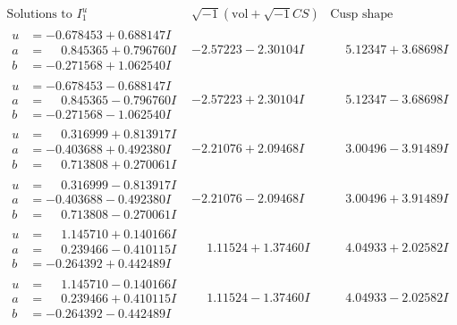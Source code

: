 \documentclass[1p]{elsarticle_modified}
\theoremstyle{definition}
\newcommand{\I}{\sqrt{-1}}
\begin{document}
$$\begin{array}{c|c|c}  
\text{Solutions to }I^u_{1}& \I (\text{vol} + \sqrt{-1}CS) & \text{Cusp shape}\\
 \hline 
\begin{aligned}
u &= -0.678453 + 0.688147 I \\
a &= \phantom{-}0.845365 + 0.796760 I \\
b &= -0.271568 + 1.062540 I\end{aligned}
 & -2.57223 - 2.30104 I & \phantom{-}5.12347 + 3.68698 I \\ \hline\begin{aligned}
u &= -0.678453 - 0.688147 I \\
a &= \phantom{-}0.845365 - 0.796760 I \\
b &= -0.271568 - 1.062540 I\end{aligned}
 & -2.57223 + 2.30104 I & \phantom{-}5.12347 - 3.68698 I \\ \hline\begin{aligned}
u &= \phantom{-}0.316999 + 0.813917 I \\
a &= -0.403688 + 0.492380 I \\
b &= \phantom{-}0.713808 + 0.270061 I\end{aligned}
 & -2.21076 + 2.09468 I & \phantom{-}3.00496 - 3.91489 I \\ \hline\begin{aligned}
u &= \phantom{-}0.316999 - 0.813917 I \\
a &= -0.403688 - 0.492380 I \\
b &= \phantom{-}0.713808 - 0.270061 I\end{aligned}
 & -2.21076 - 2.09468 I & \phantom{-}3.00496 + 3.91489 I \\ \hline\begin{aligned}
u &= \phantom{-}1.145710 + 0.140166 I \\
a &= \phantom{-}0.239466 - 0.410115 I \\
b &= -0.264392 + 0.442489 I\end{aligned}
 & \phantom{-}1.11524 + 1.37460 I & \phantom{-}4.04933 + 2.02582 I \\ \hline\begin{aligned}
u &= \phantom{-}1.145710 - 0.140166 I \\
a &= \phantom{-}0.239466 + 0.410115 I \\
b &= -0.264392 - 0.442489 I\end{aligned}
 & \phantom{-}1.11524 - 1.37460 I & \phantom{-}4.04933 - 2.02582 I \\ \hline\begin{aligned}

\end{aligned}
\end{array}$$
\end{document}
